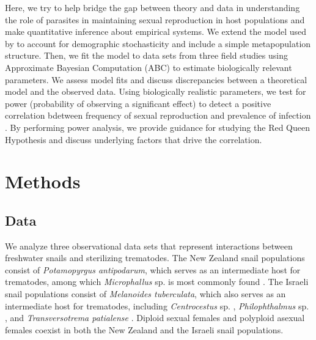 \documentclass{article}\usepackage[]{graphicx}\usepackage[]{color}
\begin{document}
Here, we try to help bridge the gap between theory and data in understanding the role of parasites in maintaining sexual reproduction in host populations and make quantitative inference about empirical systems.
We extend the model used by \cite{lively2010epidemiological} to account for demographic stochasticity and include a simple metapopulation structure.
Then, we fit the model to data sets from three field studies \citep{dagan2013clonal, mckone2016fine, vergara2014infection} using Approximate Bayesian Computation (ABC) to estimate biologically relevant parameters.
We assess model fits and discuss discrepancies between a theoretical model and the observed data.
Using biologically realistic parameters, we test for power (probability of observing a significant effect) to detect a positive correlation bdetween frequency of sexual reproduction and prevalence of infection \cite{lively2001trematode}.
By performing power analysis, we provide guidance for studying the Red Queen Hypothesis and discuss underlying factors that drive the correlation.

\section{Methods}

\subsection{Data}

We analyze three observational data sets \citep{vergara2014infection, mckone2016fine, dagan2013clonal} that represent interactions between freshwater snails and sterilizing trematodes.
The New Zealand snail populations \citep{vergara2014infection, mckone2016fine} consist of \textit{Potamopyrgus antipodarum}, which serves as an intermediate host for trematodes, 
among which \textit{Microphallus} sp. is most commonly found \citep{winterbourn1974larval, lively1987evidence}.
The Israeli snail populations \citep{dagan2013clonal} consist of \textit{Melanoides tuberculata}, which also serves as an intermediate host for trematodes, including \textit{Centrocestus} sp. \citep{ben2005spatial}, \textit{Philophthalmus} sp. \citep{ben2006first}, and \textit{Transversotrema patialense} \citep{ben2005differential}.
Diploid sexual females and polyploid asexual females coexist in both the New Zealand \citep{phillips1989genetics, wallace1992parthenogenesis, dybdahl1995diverse} and the Israeli \citep{samadi1999microsatellite} snail populations.
\end{document}
